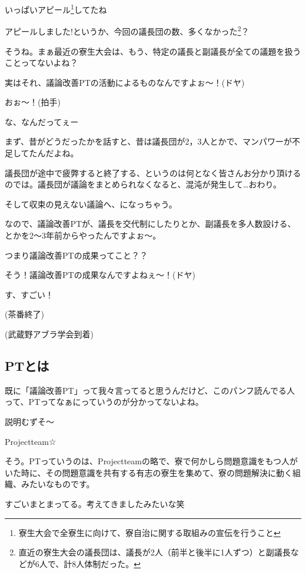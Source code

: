 \begin{multicols}{2}
いっぱいアピール\footnote{寮生大会で全寮生に向けて、寮自治に関する取組みの宣伝を行うこと}してたね

アピールしました!というか、今回の議長団の数、多くなかった\footnote{直近の寮生大会の議長団は、議長が2人（前半と後半に1人ずつ）と副議長などが6人で、計8人体制だった。}？

そうね。まぁ最近の寮生大会は、もう、特定の議長と副議長が全ての議題を扱うことってないよね？

実はそれ、議論改善PTの活動によるものなんですよぉ〜！(ドヤ)

おぉ〜！(拍手)

な、なんだってぇー

まず、昔がどうだったかを話すと、昔は議長団が2，3人とかで、マンパワーが不足してたんだよね。

議長団が途中で疲弊すると終了する、というのは何となく皆さんお分かり頂けるのでは。議長団が議論をまとめられなくなると、混沌が発生して…おわり。

そして収束の見えない議論へ、になっちゃう。

なので、議論改善PTが、議長を交代制にしたりとか、副議長を多人数設ける、とかを2〜3年前からやったんですよぉ〜。

つまり議論改善PTの成果ってこと？？

そう！議論改善PTの成果なんですよねぇ〜！(ドヤ)

す、すごい！

(茶番終了)

(武蔵野アブラ学会到着)

\subsection{PTとは}

既に「議論改善PT」って我々言ってると思うんだけど、このパンフ読んでる人って、PTってなぁにっていうのが分かってないよね。

説明むずそ〜

Projectteam☆

そう。PTっていうのは、Projectteamの略で、寮で何かしら問題意識をもつ人がいた時に、その問題意識を共有する有志の寮生を集めて、寮の問題解決に動く組織、みたいなものです。

すごいまとまってる。考えてきましたみたいな笑


\end{multicols}
